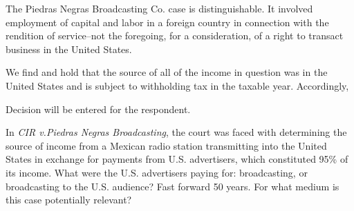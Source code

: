 \begin{select}
The Piedras Negras Broadcasting Co. case is distinguishable. It involved employment of capital and labor in a foreign country in connection with the rendition of service--not the foregoing, for a consideration, of a right to transact business in the United States.

We find and hold that the source of all of the income in question was in the United States and is subject to withholding tax in the taxable year. Accordingly,

Decision will be entered for the respondent.
\end{select}

In \emph{CIR v.\@ Piedras Negras Broadcasting}, the court was faced with determining the source of income from a Mexican radio station transmitting into the United States in exchange for payments from U.S. advertisers, which constituted 95\% of its income.  What were the U.S. advertisers paying for: broadcasting, or broadcasting to the U.S. audience?  Fast forward 50 years.  For what medium is this case potentially relevant?      
   
